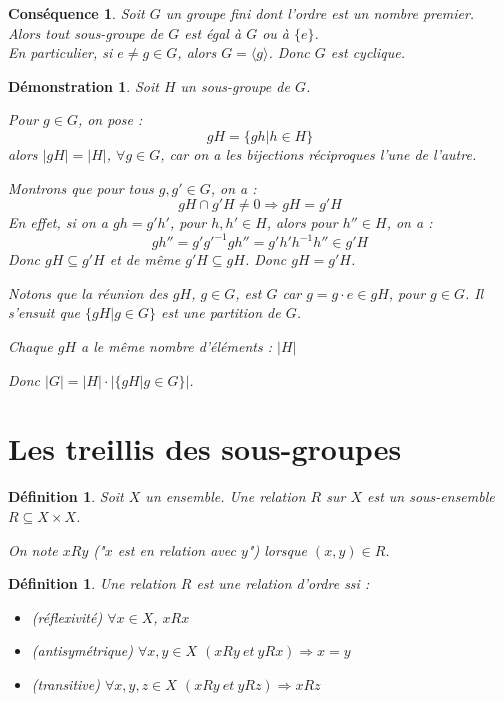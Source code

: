 \documentclass[a4paper, oneside]{report}
\theoremstyle{break}
\newtheorem{defi}[thm]{Définition}
\newtheorem{cons}[thm]{Conséquence}
\newtheorem*{demo}{Démonstration}
\newcommand{\x}{\times}
\begin{document}
\begin{cons}
	Soit $G$ un groupe fini dont l'ordre est un nombre premier.\\
	Alors tout sous-groupe de $G$ est égal à $G$ ou à $\{e\}$.\\
	En particulier, si $e\neq g\in G$, alors $G=\langle g\rangle$. Donc $G$ est cyclique.
\end{cons}

\begin{demo}
	Soit $H$ un sous-groupe de $G$.
	
	Pour $g\in G$, on pose :
	$$gH=\{gh | h\in H \}$$
	alors $|gH|=|H|$, $\forall g\in G$, car on a les bijections réciproques l'une de l'autre.
	
	Montrons que pour tous $g,g'\in G$, on a :
	$$gH\cap g'H \neq 0 \Rightarrow gH=g'H$$
	En effet, si on a $gh=g'h'$, pour $h,h'\in H$, alors pour $h''\in H$, on a :
	$$gh''=g'g'^{-1}gh''=g'h'h^{-1}h'' \in g'H$$
	Donc $gH\subseteq g'H$ et de même $g'H \subseteq gH$. Donc $gH=g'H$.
	
	Notons que la réunion des $gH$, $g\in G$, est $G$ car $g=g \cdot e \in gH$, pour $g\in G$. Il s'ensuit que $\{gH| g\in G \}$ est une partition de $G$.
	
	Chaque $gH$ a le même nombre d'éléments : $|H|$
	
	Donc $|G| = |H| \cdot |\{gH | g\in G \}|$.
\end{demo}

\section{Les treillis des sous-groupes}

\begin{defi}
	Soit $X$ un ensemble. Une relation $R$ sur $X$ est un sous-ensemble $R\subseteq X\x X$.
	
	On note $xRy$ ("$x$ est en relation avec $y$") lorsque $(x,y)\in R$.	
\end{defi}

\begin{defi} 
	Une relation $R$ est une relation d'ordre ssi :
	\begin{itemize}
	\item (réflexivité) $\forall x \in X$, $xRx$
	\item (antisymétrique) $\forall x,y\in X$ $(xRy~et~yRx)\Rightarrow x=y$
	\item (transitive) $\forall x,y,z\in X$ $(xRy~et~yRz) \Rightarrow xRz$
	\end{itemize}
\end{defi}
\end{document}
